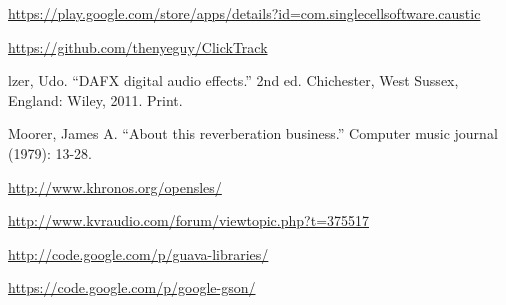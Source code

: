 \documentclass[letterpaper,12pt]{article}
\begin{document}
\clearpage
\begin{thebibliography}{9}
\singlespacing

    \url{https://play.google.com/store/apps/details?id=com.singlecellsoftware.caustic}

    \url{https://github.com/thenyeguy/ClickTrack}

    lzer, Udo. ``DAFX digital audio effects.'' 2nd ed. 
    Chichester, West Sussex, England: Wiley, 2011. Print.

    Moorer, James A. ``About this reverberation business.'' 
    Computer music journal (1979): 13-28.

    \url{http://www.khronos.org/opensles/}

    \url{http://www.kvraudio.com/forum/viewtopic.php?t=375517}

    \url{http://code.google.com/p/guava-libraries/}

    \url{https://code.google.com/p/google-gson/}

\end{thebibliography}
\end{document}
